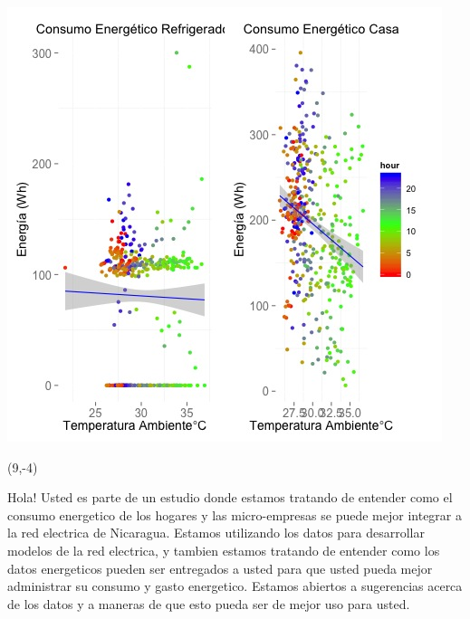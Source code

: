 \documentclass{article}\usepackage[]{graphicx}\usepackage[]{color}
\newenvironment{knitrout}{}{} %
\begin{document}
\begin{knitrout}
\color{fgcolor}
\includegraphics[scale=0.75]{figure/A20_correlaciones} 
\end{knitrout}

 \begin{textblock}{1}(9,-4)
\begin{minipage}{20em}
\begingroup

\endgroup
\end{minipage}
\end{textblock}

\vspace{70px}
\begin{knitrout}
Hola! Usted es parte de un estudio donde estamos tratando de entender como el consumo energetico de los hogares y las micro-empresas se puede mejor integrar a la red electrica de Nicaragua. Estamos utilizando los datos para desarrollar modelos de la red electrica, y tambien estamos tratando de entender como los datos energeticos pueden ser entregados a usted para que usted pueda mejor administrar su consumo y gasto energetico.  Estamos abiertos a sugerencias acerca de los datos y a maneras de que esto pueda ser de mejor uso para usted.
\end{knitrout}
\end{document}

